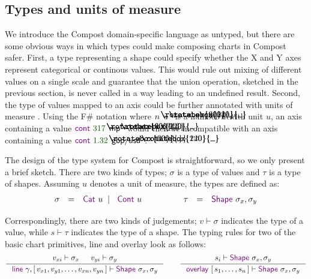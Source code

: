 \documentclass{jfp}
\newcommand{\lsep}{\;\;|\;\;}
\newcommand{\num}[1]{\textcolor{numclr}{#1}}
\newcommand{\ident}[1]{\textnormal{\textcolor{idclr}{\sffamily #1}}}
\newcommand{\kvd}[1]{\textnormal{\textcolor{kvdclr}{\sffamily #1}}}
\newcommand{\langl}{\begin{picture}(4.5,7)
\put(1.1,2.5){\rotatebox{60}{\line(1,0){5.5}}}
\put(1.1,2.5){\rotatebox{300}{\line(1,0){5.5}}}
\end{picture}}
\newcommand{\rangl}{\begin{picture}(4.5,7)
\put(.9,2.5){\rotatebox{120}{\line(1,0){5.5}}}
\put(.9,2.5){\rotatebox{240}{\line(1,0){5.5}}}
\end{picture}}
\begin{document}
\subsection{Types and units of measure}
We introduce the Compost domain-specific language as untyped, but there are some obvious ways in
which types could make composing charts in Compost safer. First, a type representing a shape could
specify whether the X and Y axes represent categorical or continous values. This would rule out
mixing of different values on a single scale and guarantee that the \ident{union} operation,
sketched in the previous section, is never called in a way leading to an undefined result.
Second, the type of values mapped to an axis could be further annotated with units of measure
\cite{units}. Using the F\# notation where $n\langl u\rangl$ is a number $n$ with unit $u$,
an axis containing a value $\kvd{cont}~\num{317}\langl \ident{mp}\rangl$ would then be incompatible
with an axis containing a value $\kvd{cont}~\num{1.32}\langl \ident{gbp}/\ident{usd}\rangl$.

The design of the type system for Compost is straightforward, so we only present a brief sketch.
There are two kinds of types; $\sigma$ is a type of values and $\tau$ is a type of shapes.
Assuming $u$ denotes a unit of measure, the types are defined as:
%
\begin{equation*}
\begin{array}{rcl}
\sigma & = & \kvd{Cat}~u \lsep \kvd{Cont}~u
\end{array}
\qquad\qquad
\begin{array}{rcl}
\tau & = & \kvd{Shape}~\sigma_x, \sigma_y \\
\end{array}
\end{equation*}

\vspace{-1em}
\noindent
Correspondingly, there are two kinds of judgements; $v\vdash \sigma$ indicates the type of a
value, while $s\vdash \tau$ indicates the type of a shape. The typing rules for two of the
basic chart primitives, \kvd{line} and \kvd{overlay} look as follows:
%
\begin{equation*}
\inference
  {v_{xi} \vdash \sigma_x & v_{yi} \vdash \sigma_y}
  {\kvd{line}~\gamma, [\,v_{x1}, v_{y1}, \ldots, v_{xn}, v_{yn}\,] \vdash \kvd{Shape}~\sigma_x, \sigma_y}
\qquad
\inference
  {s_i \vdash \kvd{Shape}~\sigma_x, \sigma_y}
  {\kvd{overlay}~[\,s_1, \ldots, s_n\,] \vdash \kvd{Shape}~\sigma_x, \sigma_y}
\end{equation*}
\end{document}
